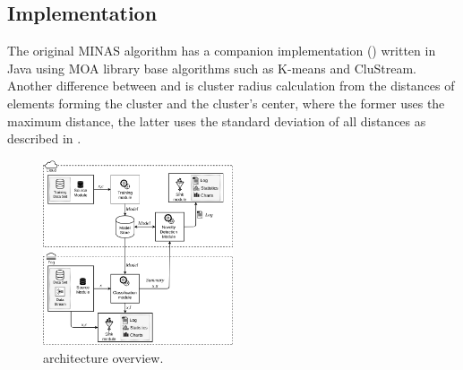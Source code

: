 \subsection{Implementation}\label{sec:implementation}

The original MINAS algorithm has a companion implementation ()
written in Java using MOA library base algorithms such as K-means and CluStream.
Another difference between  and \mfog is cluster radius calculation
from the distances of elements forming the cluster and the cluster's center,
where the former uses the maximum distance, the latter uses the standard deviation
of all distances as described in \cite{Faria2016minas}.

\begin{figure}[htb]
\centerline{\includegraphics[width=0.5\textwidth]{figures/mfog-arch-v2_en.png}}
\caption{\mfog architecture overview.}
\label{fig:mfog-architecture}
\end{figure}

